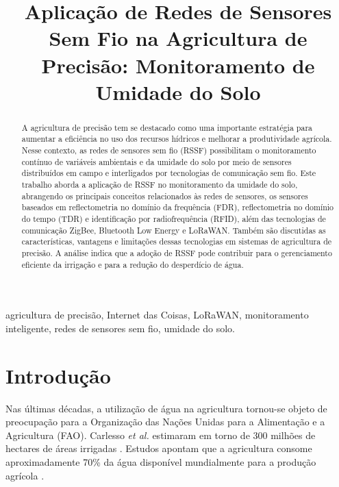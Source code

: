 \documentclass[conference]{IEEEtran}
\begin{document}
\title{Aplicação de Redes de Sensores Sem Fio na Agricultura de Precisão: Monitoramento de Umidade do Solo}

\author{%
}

\maketitle

\begin{abstract}
A agricultura de precisão tem se destacado como uma importante estratégia para aumentar a eficiência no uso dos recursos hídricos e melhorar a produtividade agrícola. Nesse contexto, as redes de sensores sem fio (RSSF) possibilitam o monitoramento contínuo de variáveis ambientais e da umidade do solo por meio de sensores distribuídos em campo e interligados por tecnologias de comunicação sem fio. Este trabalho aborda a aplicação de RSSF no monitoramento da umidade do solo, abrangendo os principais conceitos relacionados às redes de sensores, os sensores baseados em reflectometria no domínio da frequência (FDR), reflectometria no domínio do tempo (TDR) e identificação por radiofrequência (RFID), além das tecnologias de comunicação ZigBee, Bluetooth Low Energy e LoRaWAN. Também são discutidas as características, vantagens e limitações dessas tecnologias em sistemas de agricultura de precisão. A análise indica que a adoção de RSSF pode contribuir para o gerenciamento eficiente da irrigação e para a redução do desperdício de água.
\end{abstract}

\begin{IEEEkeywords}
agricultura de precisão, Internet das Coisas, LoRaWAN, monitoramento inteligente, redes de sensores sem fio, umidade do solo.
\end{IEEEkeywords}

\section{Introdução}

Nas últimas décadas, a utilização de água na agricultura tornou-se objeto de preocupação para a Organização das Nações Unidas para a Alimentação e a Agricultura (FAO). Carlesso \emph{et al.} estimaram em torno de 300 milhões de hectares de áreas irrigadas \cite{carlesso2009}. Estudos apontam que a agricultura consome aproximadamente 70\% da água disponível mundialmente para a produção agrícola \cite{hardie2020}.
\end{document}
